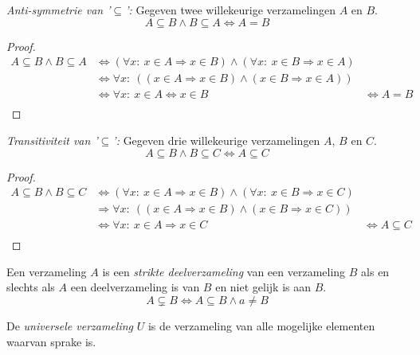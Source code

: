 \documentclass[main.tex]{subfiles}
\begin{document}
\begin{st}
  \emph{Anti-symmetrie van '$\subseteq$':} Gegeven twee willekeurige verzamelingen $A$ en $B$.
  \[ A \subseteq B \wedge B \subseteq A  \Leftrightarrow A = B \]
  \begin{proof}
    \[
    \begin{array}{cll}
      A \subseteq B \wedge B \subseteq A &\Leftrightarrow (\forall x:\ x \in A \Rightarrow x \in B) \wedge (\forall x:\ x \in B \Rightarrow x \in A) &\\
      & \Leftrightarrow \forall x:\ ((x \in A \Rightarrow x \in B) \wedge (x \in B \Rightarrow x \in A)) &\\
      & \Leftrightarrow \forall x:\ x \in A \Leftrightarrow x \in B &\Leftrightarrow A = B  \\
    \end{array}
    \]
  \end{proof}
\end{st}

\begin{st}
  \emph{Transitiviteit van '$\subseteq$':} Gegeven drie willekeurige verzamelingen $A$, $B$ en $C$.
  \[ A \subseteq B \wedge B \subseteq C  \Leftrightarrow A \subseteq C \]
  \begin{proof}
    \[
    \begin{array}{cll}
      A \subseteq B \wedge B \subseteq C &\Leftrightarrow (\forall x:\ x \in A \Rightarrow x \in B) \wedge (\forall x:\ x \in B \Rightarrow x \in C) &\\
      & \Rightarrow \forall x:\ ((x \in A \Rightarrow x \in B) \wedge (x \in B \Rightarrow x \in C)) &\\
      & \Leftrightarrow \forall x:\ x \in A \Rightarrow x \in C &\Leftrightarrow A \subseteq C  \\
    \end{array}
    \]
  \end{proof}
\end{st}

\begin{de}
  Een verzameling $A$ is een \emph{strikte deelverzameling} van een verzameling $B$ als en slechts als $A$ een deelverzameling is van $B$ en niet gelijk is aan $B$.
  \[ A \subsetneq B \Leftrightarrow A \subseteq B \wedge a \neq B \]
\end{de}

\begin{de}
  De \emph{universele verzameling} $U$ is de verzameling van alle mogelijke elementen waarvan sprake is.
\end{de}
\end{document}
